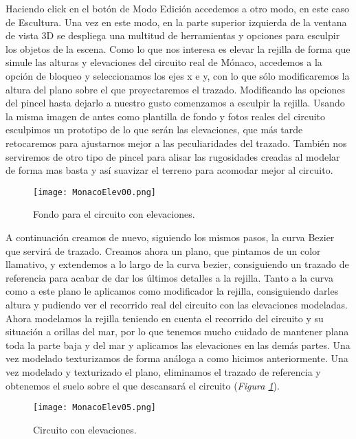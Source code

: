 Haciendo click en el botón de Modo Edición accedemos a otro modo, en este caso de Escultura. Una vez en este modo, en la parte superior izquierda de la ventana de vista 3D se despliega una multitud de herramientas y opciones para esculpir los objetos de la escena. Como lo que nos interesa es elevar la rejilla de forma que simule las alturas y elevaciones del circuito real de Mónaco, accedemos a la opción de bloqueo y seleccionamos los ejes x e y, con lo que sólo modificaremos la altura del plano sobre el que proyectaremos el trazado. Modificando las opciones del pincel hasta dejarlo a nuestro gusto comenzamos a esculpir la rejilla. Usando la misma imagen de antes como plantilla de fondo y fotos reales del circuito esculpimos un prototipo de lo que serán las elevaciones, que más tarde retocaremos para ajustarnos mejor a las peculiaridades del trazado. También nos serviremos de otro tipo de pincel para alisar las rugosidades creadas al modelar de forma mas basta y así suavizar el terreno para acomodar mejor al circuito.

\begin{figure}[t]
	\centering
	\texttt{[image: MonacoElev00.png]}
	\caption{Fondo para el circuito con elevaciones.} \label{fig:monacoelev00}
\end{figure}

A continuación creamos de nuevo, siguiendo los mismos pasos, la curva Bezier que servirá de trazado. Creamos ahora un plano, que pintamos de un color llamativo, y extendemos a lo largo de la curva bezier, consiguiendo un trazado de referencia para acabar de dar los últimos detalles a la rejilla. Tanto a la curva como a este plano le aplicamos como modificador la rejilla, consiguiendo darles altura y pudiendo ver el recorrido real del circuito con las elevaciones modeladas. Ahora modelamos la rejilla teniendo en cuenta el recorrido del circuito y su situación a orillas del mar, por lo que tenemos mucho cuidado de mantener plana toda la parte baja y del mar y aplicamos las elevaciones en las demás partes. Una vez modelado texturizamos de forma análoga a como hicimos anteriormente. Una vez modelado y texturizado el plano, eliminamos el trazado de referencia y obtenemos el suelo sobre el que descansará el circuito (\textit{Figura \ref{fig:monacoelev00}}).

\begin{figure}[hb]
	\centering
	\texttt{[image: MonacoElev05.png]}
	\caption{Circuito con elevaciones.} \label{fig:monacoelev05}
\end{figure}

